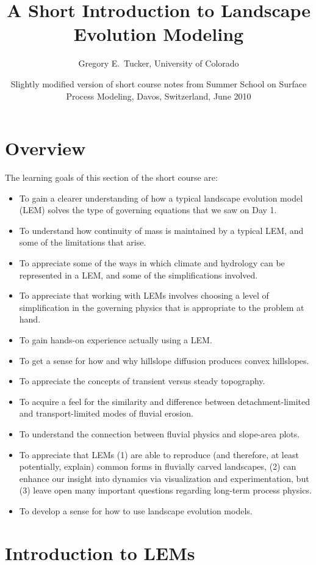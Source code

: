 \documentclass[12pt]{amsart}
\title{A Short Introduction to Landscape Evolution Modeling}
\author{Gregory E.\ Tucker, University of Colorado}
\date{Slightly modified version of short course notes from Summer School on Surface Process Modeling, Davos, Switzerland, June 2010} %
\begin{document}
\maketitle
\tableofcontents

\section{Overview}

The learning goals of this section of the short course are:
\begin{itemize}
\item To gain a clearer understanding of how a typical landscape evolution model (LEM) solves the type of governing equations that we saw on Day 1.
\item To understand how continuity of mass is maintained by a typical LEM, and some of the limitations that arise.
\item To appreciate some of the ways in which climate and hydrology can be represented in a LEM, and some of the simplifications involved.
\item To appreciate that working with LEMs involves choosing a level of simplification in the governing physics that is appropriate to the problem at hand.
\item To gain hands-on experience actually using a LEM.
\item To get a sense for how and why hillslope diffusion produces convex hillslopes.
\item To appreciate the concepts of transient versus steady topography.
\item To acquire a feel for the similarity and difference between detachment-limited and transport-limited modes of fluvial erosion.
\item To understand the connection between fluvial physics and slope-area plots.
\item To appreciate that LEMs (1) are able to reproduce (and therefore, at least potentially, explain) common forms in fluvially carved landscapes, (2) can enhance our insight into dynamics via visualization and experimentation, but (3) leave open many important questions regarding long-term process physics.
\item To develop a sense for how to use landscape evolution models.
\end{itemize}

\section{Introduction to LEMs}
\end{document}
